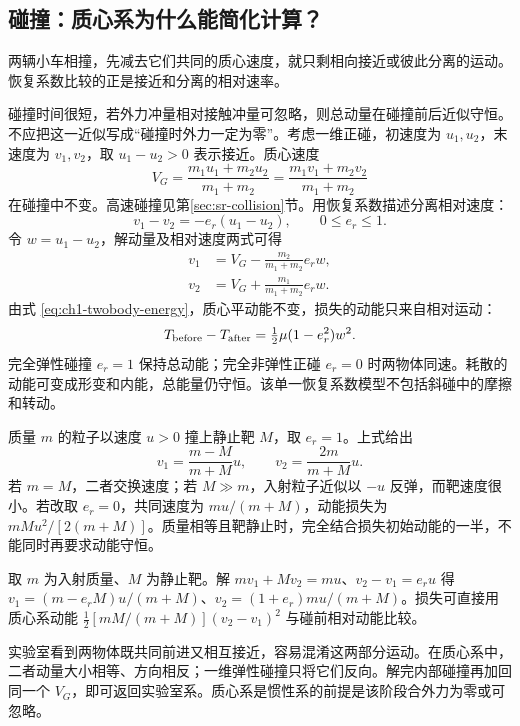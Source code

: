 \subsection{碰撞：质心系为什么能简化计算？}\label{sec:newton-collision}
两辆小车相撞，先减去它们共同的质心速度，就只剩相向接近或彼此分离的运动。恢复系数比较的正是接近和分离的相对速率。

碰撞时间很短，若外力冲量相对接触冲量可忽略，则总动量在碰撞前后近似守恒。不应把这一近似写成“碰撞时外力一定为零”。考虑一维正碰，初速度为 $u_1,u_2$，末速度为 $v_1,v_2$，取 $u_1-u_2>0$ 表示接近。质心速度
\[
V_G=\frac{m_1u_1+m_2u_2}{m_1+m_2}
=\frac{m_1v_1+m_2v_2}{m_1+m_2}
\]
在碰撞中不变。高速碰撞见第\ref{sec:sr-collision}节。用恢复系数描述分离相对速度：
\[
v_1-v_2=-e_r(u_1-u_2),\qquad 0\le e_r\le1.
\]
令 $w=u_1-u_2$，解动量及相对速度两式可得
\begin{align}
v_1&=V_G-\frac{m_2}{m_1+m_2}e_rw,\\
v_2&=V_G+\frac{m_1}{m_1+m_2}e_rw.
\end{align}
由式 \eqref{eq:ch1-twobody-energy}，质心平动能不变，损失的动能只来自相对运动：
\begin{equation}\label{eq:ch1-collision-loss}
T_{\rm before}-T_{\rm after}=\tfrac12\mu(1-e_r^2)w^2.
\end{equation}
完全弹性碰撞 $e_r=1$ 保持总动能；完全非弹性正碰 $e_r=0$ 时两物体同速。耗散的动能可变成形变和内能，总能量仍守恒。该单一恢复系数模型不包括斜碰中的摩擦和转动。
\begin{example}[一维碰撞的极限检查]
质量 $m$ 的粒子以速度 $u>0$ 撞上静止靶 $M$，取 $e_r=1$。上式给出
\[
v_1=\frac{m-M}{m+M}u,\qquad
v_2=\frac{2m}{m+M}u.
\]
若 $m=M$，二者交换速度；若 $M\gg m$，入射粒子近似以 $-u$ 反弹，而靶速度很小。若改取 $e_r=0$，共同速度为 $mu/(m+M)$，动能损失为 $mMu^2/[2(m+M)]$。质量相等且靶静止时，完全结合损失初始动能的一半，不能同时再要求动能守恒。

取 $m$ 为入射质量、$M$ 为静止靶。解 $mv_1+Mv_2=mu$、$v_2-v_1=e_ru$ 得 $v_1=(m-e_rM)u/(m+M)$、$v_2=(1+e_r)mu/(m+M)$。损失可直接用质心系动能 $\frac12[mM/(m+M)](v_2-v_1)^2$ 与碰前相对动能比较。
\end{example}
\begin{physicsbox}[title={物理图像与理解：把共同平移从碰撞中拿走}]
实验室看到两物体既共同前进又相互接近，容易混淆这两部分运动。在质心系中，二者动量大小相等、方向相反；一维弹性碰撞只将它们反向。解完内部碰撞再加回同一个 $V_G$，即可返回实验室系。质心系是惯性系的前提是该阶段合外力为零或可忽略。
\end{physicsbox}
